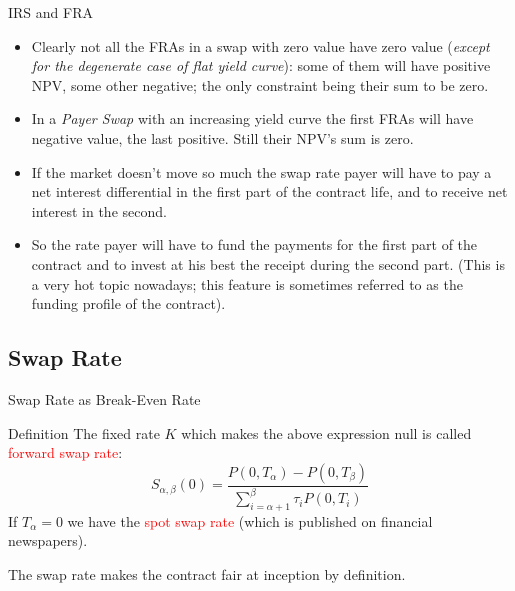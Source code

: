 \documentclass{beamer}
\begin{document}
\begin{frame}{IRS and FRA}
	\begin{itemize}
		\item<1-> Clearly not all the FRAs in a swap with zero value have zero value (\emph{except for the degenerate case of flat yield curve}): some of them will have positive NPV, some other negative; the only constraint being their sum to be zero.
		\item<2-> In a \emph{Payer Swap} with an increasing yield curve the first FRAs will have negative value, the last positive. Still their NPV's sum is zero.
		\item<3-> If the market doesn't move so much the swap rate payer will have to pay a net interest differential in the first part of the contract life, and to receive net interest in the second.
		\item<4-> So the rate payer will have to fund the payments for the first part of the contract and to invest at his best the receipt during the second part. (This is a very hot topic nowadays; this feature is sometimes referred to as the funding profile of the contract).
	\end{itemize}
\end{frame}

\subsection{Swap Rate}
\begin{frame}{Swap Rate as Break-Even Rate}
	\begin{block}{Definition}
	The fixed rate $K$ which makes the above expression null is called \textcolor{red}{forward swap rate}:
	\begin{equation}
		S_{\alpha,\beta}(0) = \frac{P(0, T_\alpha)-P(0,T_\beta)}{\sum_{i=\alpha+1}^{\beta}\tau_iP(0,T_i)}
	\end{equation}
	If $T_\alpha=0$ we have the \textcolor{red}{spot swap rate} (which is published on financial newspapers).
	\end{block}
	The swap rate makes the contract fair at inception by definition.
\end{frame}
\end{document}

